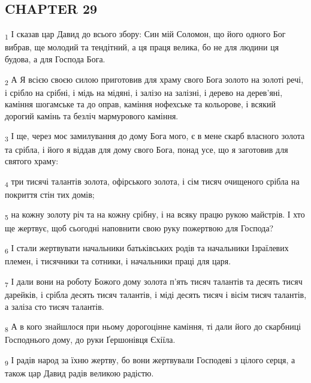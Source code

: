 \subsection{CHAPTER 29}
\begin{tcolorbox}
\textsubscript{1} І сказав цар Давид до всього збору: Син мій Соломон, що його одного Бог вибрав, ще молодий та тендітний, а ця праця велика, бо не для людини ця будова, а для Господа Бога.
\end{tcolorbox}
\begin{tcolorbox}
\textsubscript{2} А Я всією своєю силою приготовив для храму свого Бога золото на золоті речі, і срібло на срібні, і мідь на мідяні, і залізо на залізні, і дерево на дерев'яні, каміння шогамське та до оправ, каміння нофехське та кольорове, і всякий дорогий камінь та безліч мармурового каміння.
\end{tcolorbox}
\begin{tcolorbox}
\textsubscript{3} І ще, через моє замилування до дому Бога мого, є в мене скарб власного золота та срібла, і його я віддав для дому свого Бога, понад усе, що я заготовив для святого храму:
\end{tcolorbox}
\begin{tcolorbox}
\textsubscript{4} три тисячі талантів золота, офірського золота, і сім тисяч очищеного срібла на покриття стін тих домів;
\end{tcolorbox}
\begin{tcolorbox}
\textsubscript{5} на кожну золоту річ та на кожну срібну, і на всяку працю рукою майстрів. І хто ще жертвує, щоб сьогодні наповнити свою руку пожертвою для Господа?
\end{tcolorbox}
\begin{tcolorbox}
\textsubscript{6} І стали жертвувати начальники батьківських родів та начальники Ізраїлевих племен, і тисячники та сотники, і начальники праці для царя.
\end{tcolorbox}
\begin{tcolorbox}
\textsubscript{7} І дали вони на роботу Божого дому золота п'ять тисяч талантів та десять тисяч дарейків, і срібла десять тисяч талантів, і міді десять тисяч і вісім тисяч талантів, а заліза сто тисяч талантів.
\end{tcolorbox}
\begin{tcolorbox}
\textsubscript{8} А в кого знайшлося при ньому дорогоцінне каміння, ті дали його до скарбниці Господнього дому, до руки Ґершонівця Єхіїла.
\end{tcolorbox}
\begin{tcolorbox}
\textsubscript{9} І радів народ за їхню жертву, бо вони жертвували Господеві з цілого серця, а також цар Давид радів великою радістю.
\end{tcolorbox}
